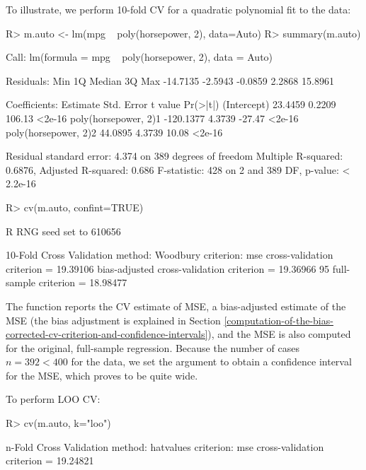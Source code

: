 \documentclass[
]{jss}
\begin{document}
To illustrate, we perform 10-fold CV for a quadratic polynomial fit to
the  data:

\begin{CodeChunk}
\begin{CodeInput}
R> m.auto <- lm(mpg ~ poly(horsepower, 2), data=Auto)
R> summary(m.auto)
\end{CodeInput}
\begin{CodeOutput}

Call:
lm(formula = mpg ~ poly(horsepower, 2), data = Auto)

Residuals:
     Min       1Q   Median       3Q      Max 
-14.7135  -2.5943  -0.0859   2.2868  15.8961 

Coefficients:
                      Estimate Std. Error t value Pr(>|t|)
(Intercept)            23.4459     0.2209  106.13   <2e-16
poly(horsepower, 2)1 -120.1377     4.3739  -27.47   <2e-16
poly(horsepower, 2)2   44.0895     4.3739   10.08   <2e-16

Residual standard error: 4.374 on 389 degrees of freedom
Multiple R-squared:  0.6876,    Adjusted R-squared:  0.686 
F-statistic:   428 on 2 and 389 DF,  p-value: < 2.2e-16
\end{CodeOutput}
\begin{CodeInput}
R> cv(m.auto, confint=TRUE)
\end{CodeInput}
\begin{CodeOutput}
R RNG seed set to 610656
\end{CodeOutput}
\begin{CodeOutput}
10-Fold Cross Validation
method: Woodbury
criterion: mse
cross-validation criterion = 19.39106
bias-adjusted cross-validation criterion = 19.36966
95%
full-sample criterion = 18.98477 
\end{CodeOutput}
\end{CodeChunk}

The function reports the CV estimate of MSE, a bias-adjusted estimate of
the MSE (the bias adjustment is explained in Section
\ref{computation-of-the-bias-corrected-cv-criterion-and-confidence-intervals}),
and the MSE is also computed for the original, full-sample regression.
Because the number of cases \(n = 392 < 400\) for the  data,
we set the argument  to obtain a confidence interval
for the MSE, which proves to be quite wide.

To perform LOO CV:

\begin{CodeChunk}
\begin{CodeInput}
R> cv(m.auto, k="loo")
\end{CodeInput}
\begin{CodeOutput}
n-Fold Cross Validation
method: hatvalues
criterion: mse
cross-validation criterion = 19.24821
\end{CodeOutput}
\end{CodeChunk}
\end{document}
